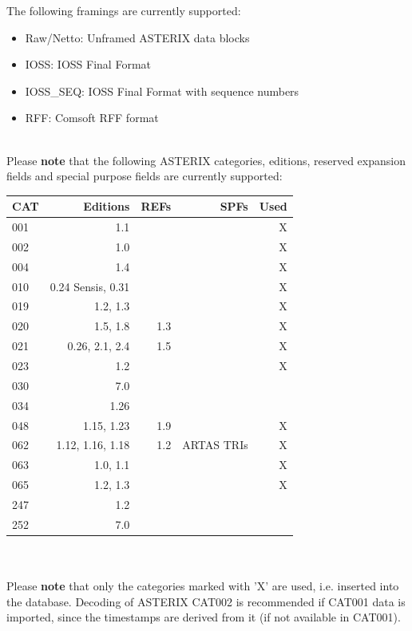 The following framings are currently supported:

\begin{itemize}
\item Raw/Netto: Unframed ASTERIX data blocks
\item IOSS: IOSS Final Format
\item IOSS\_SEQ: IOSS Final Format with sequence numbers
\item RFF: Comsoft RFF format
\end{itemize}
\ \\

Please \textbf{note} that the following ASTERIX categories, editions, reserved expansion fields and special purpose fields are currently supported: \\

\begin{tabular}{ | l | r | r | r | r |}
\hline
  CAT & Editions & REFs & SPFs & Used  \\ \hline
  001 & 1.1 & & & X \\ \hline
  002 & 1.0 & & & X  \\ \hline
  004 & 1.4 & & & X  \\ \hline
  010 & 0.24 Sensis, 0.31  &  & & X  \\ \hline
  019 & 1.2, 1.3 & & & X \\ \hline
  020 & 1.5, 1.8 & 1.3 & & X \\ \hline
  021 & 0.26, 2.1, 2.4 & 1.5 & & X \\ \hline
  023 & 1.2 & & & X \\ \hline
  030 & 7.0 & & & \\ \hline
  034 & 1.26 & & &  \\ \hline
  048 & 1.15, 1.23 & 1.9 & & X \\ \hline
  062 & 1.12, 1.16, 1.18 & 1.2 & ARTAS TRIs & X \\ \hline
  063 & 1.0, 1.1 & & & X \\ \hline
  065 & 1.2, 1.3 & & & X \\ \hline
  247 & 1.2 & & & \\ \hline
  252 & 7.0 & & & \\ \hline
\end{tabular} \\
\  \\

Please \textbf{note} that only the categories marked with 'X' are used, i.e. inserted into the database. Decoding of ASTERIX CAT002 is recommended if CAT001 data is imported, since the timestamps are derived from it (if not available in CAT001).

